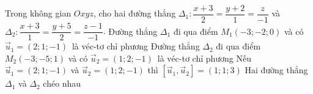 \begin{ex}%
	Trong  không gian $Oxyz$, cho hai đường thẳng $\Delta_1\colon \dfrac{x+3}{2}=\dfrac{y+2}{1}=\dfrac{z}{-1}$ và $\Delta_2\colon \dfrac{x+3}{1}=\dfrac{y+5}{2}=\dfrac{z-1}{-1}$.
	 \choiceTF
		{\True Đường thẳng $\Delta_1$ đi qua điểm  $M_1(-3;-2;0)$ và có $\overrightarrow{u}_{1}=(2;1;-1)$~là véc-tơ chỉ phương}
		{\True Đường thẳng $\Delta_2$ đi  qua điểm $M_2(-3;-5;1)$ và có $\overrightarrow{u}_{2}=(1;2;-1)$~là véc-tơ chỉ phương}
		{\True Nếu $\overrightarrow{u}_{1}=(2;1;-1)$ và $\overrightarrow{u}_{2}=(1;2;-1)$ thì  $\left[\overrightarrow{u}_{1},\overrightarrow{u}_{2}\right]=(1;1;3)$}
		{Hai đường  thẳng $\Delta_1$ và $\Delta_2$ chéo nhau}
\end{ex}

